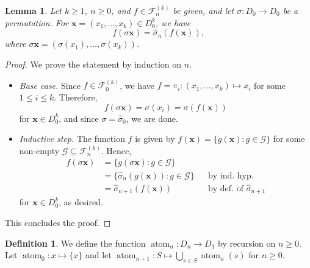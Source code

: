 \documentclass[a4paper,12pt]{article}
\newtheorem{lemma}[theorem]{Lemma}
\theoremstyle{definition}
\newtheorem{definition}[theorem]{Definition}
\theoremstyle{remark}
\newcommand{\fset}[2]{\mathcal F^{(#1)}_{#2}}
\DeclareMathOperator{\atom}{atom}
\begin{document}
\begin{lemma}\label{lem:permcomm}
    Let $k \geq 1$, $n \geq 0$, and $f \in \fset kn$ be given, and let $\sigma : D_0 \to D_0$ be a permutation. For $\mathbf x = (x_1, \dots, x_k) \in D_0^k$, we have
    \[f(\sigma\mathbf x) = \hat\sigma_n(f(\mathbf x)),\]
    where $\sigma\mathbf x = (\sigma(x_1), \dots, \sigma(x_k))$.
\end{lemma}
\begin{proof}
    We prove the statement by induction on $n$.
    \begin{itemize}
        \item \textit{Base case.} Since $f \in \fset k0$, we have $f = \pi_i : (x_1, \dots, x_k) \mapsto x_i$ for some $1 \leq i \leq k$. Therefore,
        \[f(\sigma\mathbf x) = \sigma(x_i) = \sigma(f(\mathbf x))\]
        for $\mathbf x \in D_0^k$, and since $\sigma = \hat\sigma_0$, we are done.
        \item \textit{Inductive step.} The function $f$ is given by $f(\mathbf x) = \{g(\mathbf x) : g \in \mathcal G\}$ for some non-empty $\mathcal G \subseteq \fset kn$. Hence,
        \begin{align*}
            f(\sigma\mathbf x) &= \{g(\sigma\mathbf x) : g \in \mathcal G\}\\
            &= \{\hat\sigma_n(g(\mathbf x)) : g \in \mathcal G\} &&\text{by ind.\ hyp.}\\
            &= \hat\sigma_{n+1}(f(\mathbf x)) &&\text{by def.\ of } \hat\sigma_{n+1}
        \end{align*}
        for $\mathbf x \in D_0^k$, as desired.
    \end{itemize}
    This concludes the proof.
\end{proof}

\begin{definition}
    We define the function $\atom_n : D_n \to D_1$ by recursion on $n \geq 0$. Let $\atom_0 : x \mapsto \{x\}$ and let $\atom_{n+1} : S \mapsto \bigcup_{s\in S} \atom_n(s)$ for $n \geq 0$.
\end{definition}
\end{document}
